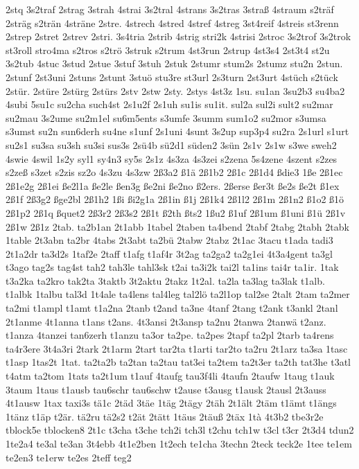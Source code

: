{2stq
3s2traf
2strag
3strah
4strai
3s2tral
4strans
3s2tras
3straß
4straum
s2träf
2sträg
s2trän
4sträne
2stre.
4strech
4stred
4stref
4streg
3st4reif
4streis
st3renn
2strep
2stret
2strev
2stri.
3s4tria
2strib
4strig
stri2k
4strisi
2stroc
3s2trof
3s2trok
st3roll
stro4ma
s2tros
s2trö
3struk
s2trum
4st3run
2strup
4st3s4
2st3t4
st2u
3s2tub
4stuc
3stud
2stue
3stuf
3stuh
2stuk
2stumr
stum2s
2stumz
stu2n
2stun.
2stunf
2st3uni
2stuns
2stunt
3stuö
stu3re
st3url
2s3turn
2st3urt
4stüch
s2tück
2stür.
2stüre
2stürg
2stürs
2stv
2stw
2sty.
2stys
4st3z
1su.
su1an
3su2b3
su4ba2
4subi
5su1c
su2cha
such4st
2s1u2f
2s1uh
su1is
su1it.
sul2a
sul2i
sult2
su2mar
su2mau
3s2ume
su2m1el
su6m5ents
s3umfe
3summ
sum1o2
su2mor
s3umsa
s3umst
su2n
sun6derh
su4ne
s1unf
2s1uni
4sunt
3s2up
sup3p4
su2ra
2s1url
s1urt
su2s1
su3sa
su3sh
su3si
sus3s
2sü4b
sü2d1
süden2
3sün
2s1v
2s1w
s3we
sweh2
4swie
4swil
1s2y
syl1
sy4n3
sy5s
2s1z
4s3za
4s3zei
s2zena
5s4zene
4szent
s2zes
s2zeß
s3zet
s2zis
sz2o
4s3zu
4s3zw
2ß3a2
ß1ä
2ß1b2
2ß1c
2ß1d4
ßdie3
1ße
2ß1ec
2ß1e2g
2ß1ei
ße2l1a
ße2le
ßen3g
ße2ni
ße2no
ß2ers.
2ßerse
ßer3t
ße2s
ße2t
ß1ex
2ß1f
2ß3g2
ßge2bl
2ß1h2
1ßi
ßi2g1a
2ß1in
ß1j
2ß1k4
2ß1l2
2ß1m
2ß1n2
ß1o2
ß1ö
2ß1p2
2ß1q
ßquet2
2ß3r2
2ß3s2
2ß1t
ß2th
ßts2
1ßu2
ß1uf
2ß1um
ß1uni
ß1ü
2ß1v
2ß1w
2ß1z
2tab.
ta2b1an
2t1abb
1tabel
2taben
ta4bend
2tabf
2tabg
2tabh
2tabk
1table
2t3abn
ta2br
4tabs
2t3abt
ta2bü
2tabw
2tabz
2t1ac
3tacu
t1ada
tadi3
2t1a2dr
ta3d2s
1taf2e
2taff
t1afg
t1af4r
3t2ag
ta2ga2
ta2g1ei
4t3a4gent
ta3gl
t3ago
tag2s
tag4st
tah2
tah3le
tahl3sk
t2ai
ta3i2k
tai2l
ta1ins
tai4r
ta1ir.
1tak
t3a2ka
ta2kro
tak2ta
3taktb
3t2aktu
2takz
1t2al.
ta2la
ta3lag
ta3lak
t1alb.
t1albk
1talbu
tal3d
1t4ale
ta4lens
tal4leg
tal2lö
ta2l1op
tal2se
2talt
2tam
ta2mer
ta2mi
t1ampl
t1amt
t1a2na
2tanb
t2and
ta3ne
4tanf
2tang
t2ank
t3ankl
2tanl
2t1anme
4t1anna
t1ans
t2ans.
4t3ansi
2t3ansp
ta2nu
2tanwa
2tanwä
t2anz.
t1anza
4tanzei
tan6zerh
t1anzu
ta3or
ta2pe.
ta2pes
2tapf
ta2pl
2tarb
ta4rens
ta4r3ere
3t4a3ri
2tark
2t1arm
2tart
tar2ta
t1arti
tar2to
ta2ru
2t1arz
ta3sa
1tasc
t1asp
1tas2t
1tat.
ta2ta2b
ta2tan
ta2tau
tat3ei
ta2tem
ta2t3er
ta2th
tat3he
t3atl
t4atm
ta2tom
1tats
ta2t1um
t1auf
4taufg
tau3f4li
4taufn
2taufw
1taug
t1auk
3taum
1taus
t1ausb
tau6schr
tau6schw
t2ause
t3ausg
t1ausk
2tausl
2t3auss
4t1ausw
1tax
taxi3s
tä1c
2täd
3täe
1täg
2tägy
2täh
2t1ält
2täm
t1ämt
t1ängs
1tänz
t1äp
t2är.
tä2ru
tä2s2
t2ät
2tätt
1täus
2täuß
2täx
1tà
4t3b2
tbe3r2e
tblock5e
tblocken8
2t1c
t3cha
t3che
tch2i
tch3l
t2chu
tch1w
t3cl
t3cr
2t3d4
tdun2
1te2a4
te3al
te3an
3t4ebb
4t1e2ben
1t2ech
te1cha
3techn
2teck
teck2e
1tee
te1em
te2en3
te1erw
te2es
2teff
teg2
}
